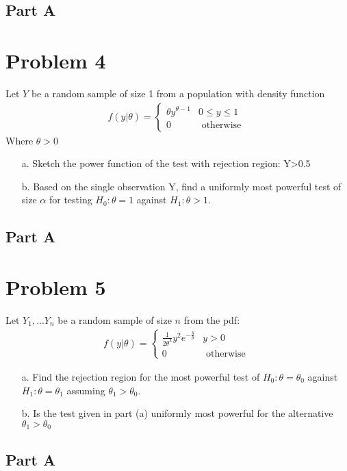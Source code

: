\documentclass{article}
\begin{document}
\subsection*{Part A}
\clearpage

\section*{Problem 4}
Let $Y$ be a random sample of size 1 from a population with density function
\begin{align*}
f(y|\theta) =
\begin{cases} 
      \theta y^{\theta-1} & 0 \leq y \leq 1 \\
      0 & \text{ otherwise  }
   \end{cases}
\end{align*}
Where $\theta > 0$
\begin{enumerate}
\item[a.] Sketch the power function of the test with rejection region: Y>0.5
\item[b.] Based on the single observation Y, find a uniformly most powerful test of size $\alpha$ for testing $H_0:\theta = 1$ against $H_1: \theta > 1$.
\end{enumerate}
\subsection*{Part A}
\clearpage

\section*{Problem 5}
Let $Y_1,...Y_n$ be a random sample of size $n$ from the pdf:
\begin{align*}
f(y|\theta) =
\begin{cases} 
      \frac{1}{2\theta^3} y^2 e^{-\frac{y}{\theta}} & y>0 \\
      0 & \text{ otherwise  }
   \end{cases}
\end{align*}
\begin{enumerate}
\item[a.] Find the rejection region for the most powerful test of $H_0: \theta = \theta_0$ against $H_1:\theta=\theta_1$ assuming $\theta_1>\theta_0$.
\item[b.]  Is the test given in part (a) uniformly most powerful for the alternative $\theta_1 > \theta_0$
\end{enumerate}
\subsection*{Part A}
\clearpage
\end{document}
